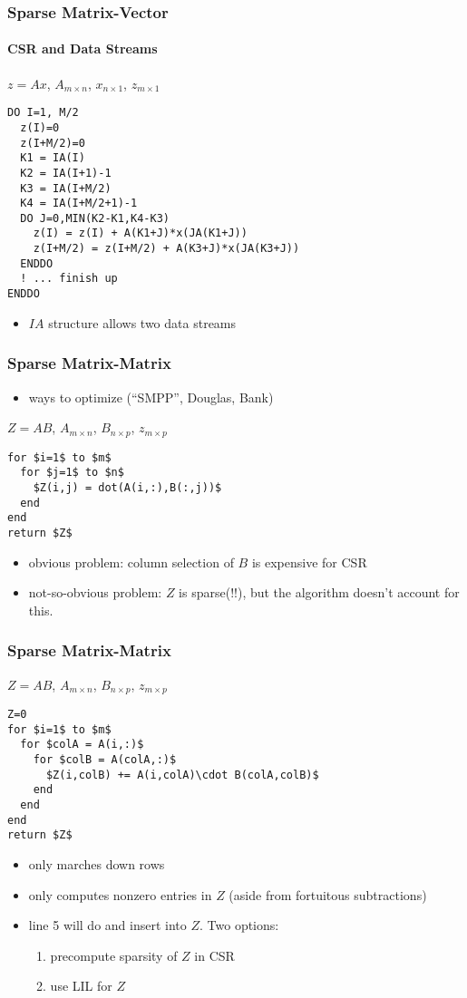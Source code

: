 \documentclass[10pt]{beamer}
\begin{document}
\begin{frame}[fragile]
\frametitle{Sparse Matrix-Vector}
\framesubtitle{CSR and Data Streams}
$z = Ax$, $A_{m\times n}$, $x_{n\times 1}$, $z_{m\times 1}$
\begin{lstlisting}[mathescape, language=FORTRAN]
DO I=1, M/2
  z(I)=0
  z(I+M/2)=0
  K1 = IA(I)
  K2 = IA(I+1)-1
  K3 = IA(I+M/2)
  K4 = IA(I+M/2+1)-1
  DO J=0,MIN(K2-K1,K4-K3)
    z(I) = z(I) + A(K1+J)*x(JA(K1+J))
    z(I+M/2) = z(I+M/2) + A(K3+J)*x(JA(K3+J))
  ENDDO
  ! ... finish up 
ENDDO
\end{lstlisting}
  \begin{itemize}
  \item $IA$ structure allows two data streams
  \end{itemize}
\end{frame}
\begin{frame}[fragile]
\frametitle{Sparse Matrix-Matrix}
  \begin{itemize}
  \item ways to optimize (``SMPP'', Douglas, Bank)
  \end{itemize}
$Z = AB$, $A_{m\times n}$, $B_{n\times p}$, $z_{m\times p}$
\begin{lstlisting}[mathescape]
for $i=1$ to $m$
  for $j=1$ to $n$
    $Z(i,j) = dot(A(i,:),B(:,j))$
  end
end
return $Z$
\end{lstlisting}
  \begin{itemize}
  \item obvious problem: column selection of $B$ is expensive for CSR
  \item not-so-obvious problem: $Z$ is sparse(!!), but the algorithm
doesn't account for this.
  \end{itemize}
\end{frame}
\begin{frame}[fragile]
\frametitle{Sparse Matrix-Matrix}
$Z = AB$, $A_{m\times n}$, $B_{n\times p}$, $z_{m\times p}$
\begin{lstlisting}[mathescape]
Z=0
for $i=1$ to $m$
  for $colA = A(i,:)$
    for $colB = A(colA,:)$
      $Z(i,colB) += A(i,colA)\cdot B(colA,colB)$
    end
  end
end
return $Z$
\end{lstlisting}
  \begin{itemize}
    \item only marches down rows
    \item only computes nonzero entries in $Z$ (aside from fortuitous
subtractions)
    \item line 5 will do and insert into $Z$.  Two options:
      \begin{enumerate}
        \item precompute sparsity of $Z$ in CSR
        \item use LIL for $Z$
      \end{enumerate}
  \end{itemize}
\end{frame}
\end{document}
